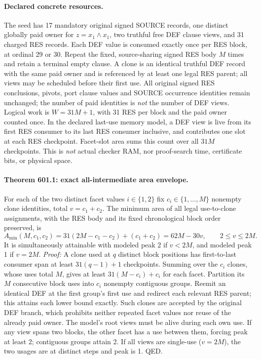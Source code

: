 \documentclass[11pt]{article}
\begin{document}
\paragraph{Declared concrete resources.}
The seed has 17 mandatory original signed SOURCE records, one distinct globally paid owner for $z=x_1\land x_1$, two truthful free DEF clause views, and 31 charged RES records. Each DEF value is consumed exactly once per RES block, at ordinal 29 or 30. Repeat the fixed, source-sharing signed RES body $M$ times and retain a terminal empty clause. A clone is an identical truthful DEF record with the same paid owner and is referenced by at least one legal RES parent; all views may be scheduled before their first use. All original signed RES conclusions, pivots, port clause values and SOURCE occurrence identities remain unchanged; the number of paid identities is \emph{not} the number of DEF views. Logical work is $W=31M+1$, with 31 RES per block and the paid owner counted once. In the declared last-use memory model, a DEF view is live from its first RES consumer to its last RES consumer inclusive, and contributes one slot at each RES checkpoint. Facet-slot area sums this count over all $31M$ checkpoints. This is \emph{not} actual checker RAM, nor proof-search time, certificate bits, or physical space.

\paragraph{Theorem 601.1: exact all-intermediate area envelope.}
For each of the two distinct facet values $i\in\{1,2\}$ fix $c_i\in\{1,\ldots,M\}$ nonempty clone identities, total $v=c_1+c_2$. The minimum area of all legal use-to-clone assignments, with the RES body and its fixed chronological block order preserved, is
\[
\boxed{A_{\min}(M,c_1,c_2)=31(2M-c_1-c_2)+(c_1+c_2)=62M-30v,\qquad 2\le v\le 2M.}
\]
It is simultaneously attainable with modeled peak 2 if $v<2M$, and modeled peak 1 if $v=2M$. \emph{Proof:} A clone used at $q$ distinct block positions has first-to-last consumer span at least $31(q-1)+1$ checkpoints. Summing over the $c_i$ clones, whose uses total $M$, gives at least $31(M-c_i)+c_i$ for each facet. Partition its $M$ consecutive block uses into $c_i$ nonempty contiguous groups. Reemit an identical DEF at the first group's first use and redirect each relevant RES parent; this attains each lower bound exactly. Such clones are accepted by the original DEF branch, which prohibits neither repeated facet values nor reuse of the already paid owner. The model's root views must be alive during each own use. If any view spans two blocks, the other facet has a use between them, forcing peak at least 2; contiguous groups attain 2. If all views are single-use ($v=2M$), the two usages are at distinct steps and peak is 1. QED.
\end{document}
